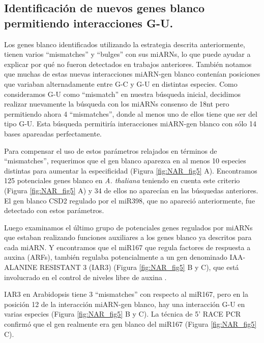 \subsection{Identificación de nuevos genes blanco permitiendo interacciones G-U.}

Los genes blanco identificados utilizando la estrategia descrita anteriormente, tienen varios ``mismatches'' y ``bulges'' con sus miARNs, lo que puede ayudar a explicar por qué no fueron detectados en trabajos anteriores.
También notamos que muchas de estas nuevas interacciones miARN-gen blanco contenían posiciones que variaban alternadamente entre G-C y G-U en distintas especies.
Como consideramos G-U como ``mismatch'' en nuestra búsqueda inicial, decidimos realizar nuevamente la búsqueda con los miARNs consenso de 18nt pero permitiendo ahora 4 ``mismatches'', donde al menos uno de ellos tiene que ser del tipo G-U.
Esta búsqueda permitiría interacciones miARN-gen blanco con sólo 14 bases apareadas perfectamente.

Para compensar el uso de estos parámetros relajados en términos de ``mismatches'', requerimos que el gen blanco aparezca en al menos 10 especies distintas para aumentar la especificidad (Figura \ref{fig:NAR_fig5} A).
Encontramos 125 potenciales genes blanco en \textit{A. thaliana} teniendo en cuenta este criterio (Figura \ref{fig:NAR_fig5} A) y 34 de ellos no aparecían en las búsquedas anteriores.
El gen blanco CSD2 regulado por el miR398, que no apareció anteriormente, fue detectado con estos parámetros. 

Luego examinamos el último grupo de potenciales genes regulados por miARNs que estaban realizando funciones auxiliares a los genes blanco ya descritos para cada miARN. 
Y encontramos que el miR167 que regula factores de respuesta a auxina (ARFs), también regulaba potencialmente a un gen denominado IAA-ALANINE RESISTANT 3 (IAR3) (Figura \ref{fig:NAR_fig5} B y C), que está involucrado en el control de niveles libre de auxina \citep{Davies1999,Rampey2004}.

IAR3 en Arabidopsis tiene 3 ``mismatches'' con respecto al miR167, pero en la posición 12 de la interacción miARN-gen blanco, hay una interacción G-U en varias especies (Figura \ref{fig:NAR_fig5} B y C).
La técnica de 5’ RACE PCR confirmó que el gen realmente era gen blanco del miR167 (Figura \ref{fig:NAR_fig5} C).

